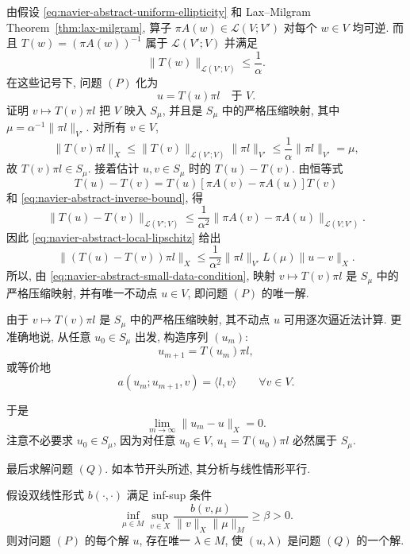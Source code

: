 \begin{Proof}
由假设 \eqref{eq:navier-abstract-uniform-ellipticity} 和
Lax--Milgram Theorem~\ref{thm:lax-milgram},
算子 $\pi A(w)\in\mathcal L(V;V')$ 对每个 $w\in V$ 均可逆.
而且 $T(w)=(\pi A(w))^{-1}$ 属于 $\mathcal L(V';V)$ 并满足
\begin{equation}\label{eq:navier-abstract-inverse-bound}
\|T(w)\|_{\mathcal L(V';V)}\leq\frac1\alpha.
\end{equation}
在这些记号下, 问题 $(P)$ 化为
\[
u=T(u)\pi l\quad\text{于 }V.
\]
证明 $v\mapsto T(v)\pi l$ 把 $V$ 映入 $S_\mu$,
并且是 $S_\mu$ 中的严格压缩映射, 其中
$\mu=\alpha^{-1}\|\pi l\|_{V'}$.
对所有 $v\in V$,
\[
\|T(v)\pi l\|_X
\leq\|T(v)\|_{\mathcal L(V';V)}\|\pi l\|_{V'}
\leq\frac1\alpha\|\pi l\|_{V'}=\mu,
\]
故 $T(v)\pi l\in S_\mu$.
接着估计 $u,v\in S_\mu$ 时的 $T(u)-T(v)$.
由恒等式
\[
T(u)-T(v)=T(u)[\pi A(v)-\pi A(u)]T(v)
\]
和 \eqref{eq:navier-abstract-inverse-bound}, 得
\[
\|T(u)-T(v)\|_{\mathcal L(V';V)}
\leq\frac1{\alpha^2}
\|\pi A(v)-\pi A(u)\|_{\mathcal L(V;V')}.
\]
因此 \eqref{eq:navier-abstract-local-lipschitz} 给出
\[
\|(T(u)-T(v))\pi l\|_X
\leq\frac1{\alpha^2}\|\pi l\|_{V'}L(\mu)\|u-v\|_X.
\]
所以, 由 \eqref{eq:navier-abstract-small-data-condition},
映射 $v\mapsto T(v)\pi l$ 是 $S_\mu$ 中的严格压缩映射,
并有唯一不动点 $u\in V$, 即问题 $(P)$ 的唯一解.
\end{Proof}

\setcounter{statement}{1}
\begin{Remark}\label{rem:navier-successive-approximations}
由于 $v\mapsto T(v)\pi l$ 是 $S_\mu$ 中的严格压缩映射,
其不动点 $u$ 可用逐次逼近法计算. 更准确地说,
从任意 $u_0\in S_\mu$ 出发, 构造序列 $(u_m)$:
\[
u_{m+1}=T(u_m)\pi l,
\]
或等价地
\begin{equation}\label{eq:navier-successive-approximation}
a(u_m;u_{m+1},v)=\langle l,v\rangle
\qquad\forall v\in V.
\end{equation}

于是
\[
\lim_{m\to\infty}\|u_m-u\|_X=0.
\]
注意不必要求 $u_0\in S_\mu$, 因为对任意 $u_0\in V$,
$u_1=T(u_0)\pi l$ 必然属于 $S_\mu$.
\end{Remark}

最后求解问题 $(Q)$. 如本节开头所述, 其分析与线性情形平行.

\setcounter{statement}{3}
\begin{Theorem}\label{thm:navier-abstract-lagrange-multiplier}
假设双线性形式 $b(\cdot,\cdot)$ 满足 inf-sup 条件
\begin{equation}\label{eq:navier-abstract-inf-sup}
\inf_{\mu\in M}\sup_{v\in X}
\frac{b(v,\mu)}{\|v\|_X\|\mu\|_M}\geq\beta>0.
\end{equation}
则对问题 $(P)$ 的每个解 $u$, 存在唯一 $\lambda\in M$,
使 $(u,\lambda)$ 是问题 $(Q)$ 的一个解.
\end{Theorem}

